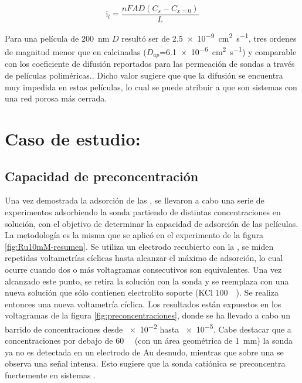 			\begin{equation}
					\text{i}_l = \frac{nFAD(C_{s}-C_{x=0})}{L}
					\label{eq:de-ferroceno-bajaT}
			\end{equation}
			  	

		Para una película de \SI{200}{nm} $D$ resultó ser de \SI{2.5e-9}{\square\cm\per\second}, tres ordenes de magnitud menor que en \pdmF\space calcinadas ($D_{ap}$=\SI{6,1e-6}{\square\cm\per\second}) y comparable con los coeficiente de difusión reportados para las permeación de sondas a través de películas poliméricas.\cite{Kolb1993}. Dicho valor sugiere que que la difusión se encuentra muy impedida en estas películas, lo cual se puede atribuir a que son sistemas con una red porosa más cerrada. 
		
\section{Caso de estudio: \texorpdfstring{\aminorutenioCompleto}{Ru(NH3)CL3}}
	
	\subsection{Capacidad de preconcentración}

		Una vez demostrada la adsorción \ru\space de las \pdm, se llevaron a cabo una serie de experimentos adsorbiendo la sonda partiendo de distintas concentraciones en solución, con el objetivo de determinar la capacidad de adsorción de las películas. La metodología es la misma que se aplicó en el experimento de la figura \ref{fig:Ru10mM-resumen}. Se utiliza un electrodo recubierto con la \pdmF, se miden repetidas voltametrías cíclicas hasta alcanzar el máximo de adsorción, lo cual ocurre cuando dos o más voltagramas consecutivos son equivalentes. Una vez alcanzado este punto, se retira la solución con la sonda y se reemplaza con una nueva solución que sólo contienen electrolito soporte (KCl \SI{100}{\milli\Molar}). Se realiza entonces una nueva voltametría cíclica. Los resultados están expuestos en los voltagramas de la figura \ref{fig:preconcentraciones}, donde se ha llevado a cabo un barrido de concentraciones desde \SI{e-2}{\Molar} hasta \SI{e-5}{\Molar}. Cabe destacar que a concentraciones por debajo de \SI{60}{\micro\Molar} (con un área geométrica de \SI{1}{mm}) la sonda ya no es detectada en un electrodo de Au desnudo, mientras que sobre una \pdm\space se observa una señal intensa. Esto sugiere que la sonda catiónica se preconcentra fuertemente en sistemas \pdmF.


